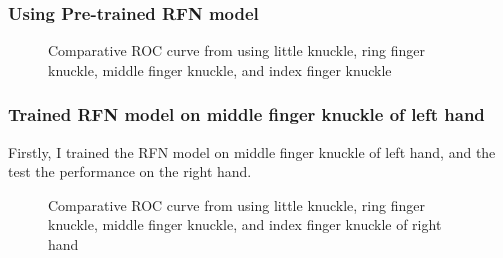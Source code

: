 \subsubsection{Using Pre-trained RFN model}

\begin{figure}[ht!]
    \centering
    \caption{Comparative ROC curve from using little knuckle, ring finger knuckle, middle finger knuckle, and index finger knuckle}
    \label{pre-trained}
\end{figure}


\subsubsection{Trained RFN model on middle finger knuckle of left hand}
Firstly, I trained the RFN model on middle finger knuckle of left hand, and the test the performance on the right hand.
\begin{figure}[ht!]
    \centering
    \caption{Comparative ROC curve from using little knuckle, ring finger knuckle, middle finger knuckle, and index finger knuckle of right hand}
    \label{trained}
\end{figure}



